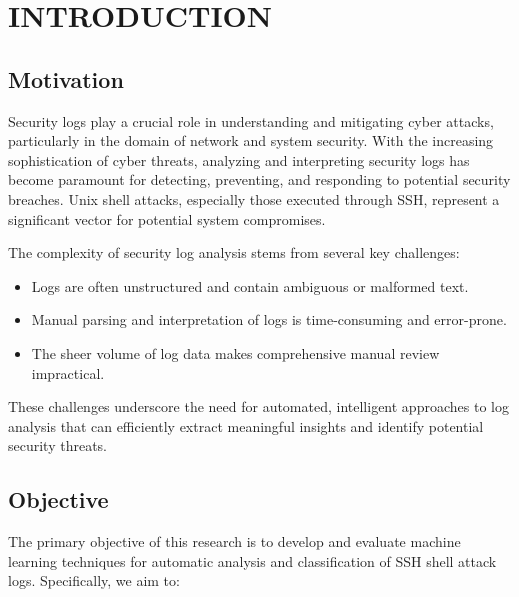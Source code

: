 

\section{INTRODUCTION}


    \subsection{Motivation}

        Security logs play a crucial role in understanding and mitigating cyber attacks, particularly in the domain of network and system security. With the increasing sophistication of cyber threats, analyzing and interpreting security logs has become paramount for detecting, preventing, and responding to potential security breaches. Unix shell attacks, especially those executed through SSH, represent a significant vector for potential system compromises.

        The complexity of security log analysis stems from several key challenges:
        
        \begin{itemize}
            \item Logs are often unstructured and contain ambiguous or malformed text.
            \item Manual parsing and interpretation of logs is time-consuming and error-prone.
            \item The sheer volume of log data makes comprehensive manual review impractical.
        \end{itemize}

        These challenges underscore the need for automated, intelligent approaches to log analysis that can efficiently extract meaningful insights and identify potential security threats.

    \subsection{Objective}

        The primary objective of this research is to develop and evaluate machine learning techniques for automatic analysis and classification of SSH shell attack logs. Specifically, we aim to:
        
